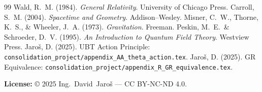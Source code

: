 \documentclass[12pt]{article}
\begin{document}
\begin{thebibliography}{99}
  Wald, R.~M. (1984). \textit{General Relativity}. University of Chicago Press.
  Carroll, S.~M. (2004). \textit{Spacetime and Geometry}. Addison--Wesley.
  Misner, C.~W., Thorne, K.~S., \& Wheeler, J.~A. (1973). \textit{Gravitation}. Freeman.
  Peskin, M.~E.\ \& Schroeder, D.~V. (1995).
  \textit{An Introduction to Quantum Field Theory}. Westview Press.
  Jaroš, D. (2025).
  UBT Action Principle: \texttt{consolidation\_project/appendix\_AA\_theta\_action.tex}.
  Jaroš, D. (2025).
  GR Equivalence: \texttt{consolidation\_project/appendix\_R\_GR\_equivalence.tex}.
\end{thebibliography}

\vspace{2em}
\noindent\textbf{License:} © 2025 Ing.~David~Jaroš — CC BY-NC-ND 4.0.
\end{document}
